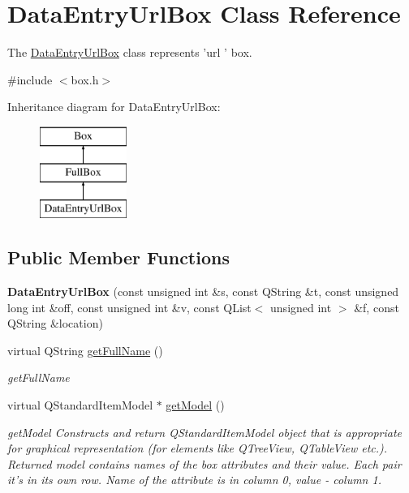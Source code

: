 \hypertarget{class_data_entry_url_box}{\section{Data\-Entry\-Url\-Box Class Reference}
\label{class_data_entry_url_box}
}


The \hyperlink{class_data_entry_url_box}{Data\-Entry\-Url\-Box} class represents 'url ' box.  




{\ttfamily \#include $<$box.\-h$>$}

Inheritance diagram for Data\-Entry\-Url\-Box\-:\begin{figure}[H]
\begin{center}
\leavevmode
\includegraphics[height=3.000000cm]{class_data_entry_url_box}
\end{center}
\end{figure}
\subsection*{Public Member Functions}
\begin{DoxyCompactItemize}
\item 
\hypertarget{class_data_entry_url_box_a032d473612d106aad0a1fa6703e1d76f}{{\bfseries Data\-Entry\-Url\-Box} (const unsigned int \&s, const Q\-String \&t, const unsigned long int \&off, const unsigned int \&v, const Q\-List$<$ unsigned int $>$ \&f, const Q\-String \&location)}\label{class_data_entry_url_box_a032d473612d106aad0a1fa6703e1d76f}

\item 
virtual Q\-String \hyperlink{class_data_entry_url_box_a33db27552c8aa8867b565b33fa3b43d5}{get\-Full\-Name} ()
\begin{DoxyCompactList}\small\item\em get\-Full\-Name \end{DoxyCompactList}\item 
virtual Q\-Standard\-Item\-Model $\ast$ \hyperlink{class_data_entry_url_box_a37fd12df4e0074f0bc2c8cc9cd3f7e5f}{get\-Model} ()
\begin{DoxyCompactList}\small\item\em get\-Model Constructs and return Q\-Standard\-Item\-Model object that is appropriate for graphical representation (for elements like Q\-Tree\-View, Q\-Table\-View etc.). Returned model contains names of the box attributes and their value. Each pair it's in its own row. Name of the attribute is in column 0, value -\/ column 1. \end{DoxyCompactList}\end{DoxyCompactItemize}
